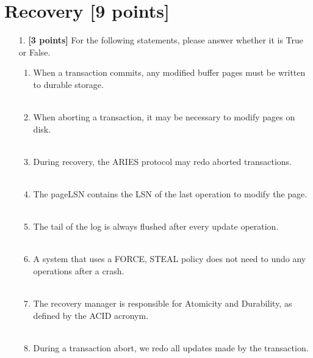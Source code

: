 \documentclass[10pt]{article}
\begin{document}
\section{Recovery \textbf{[9 points]}}
\begin{enumerate}
    \item[1.] \textbf{[3 points]} For the following statements, please answer whether it is True or False.
        \begin{enumerate}
            \item When a transaction commits, any modified buffer pages must be written to durable storage.\\ \\
            \item When aborting a transaction, it may be necessary to modify pages on disk.\\ \\
            \item During recovery, the ARIES protocol may redo aborted transactions.\\ \\
            \item The pageLSN contains the LSN of the last operation to modify the page.\\ \\
            \item The tail of the log is always flushed after every update operation.\\ \\
            \item A system that uses a FORCE, STEAL policy does not need to undo any operations after a crash.\\ \\
            \item The recovery manager is responsible for Atomicity and Durability, as defined by the ACID acronym.\\ \\
            \item During a transaction abort, we redo all updates made by the transaction.\\ \\ \\ \\ \\ \\
        \end{enumerate}


\end{enumerate}
\end{document}
